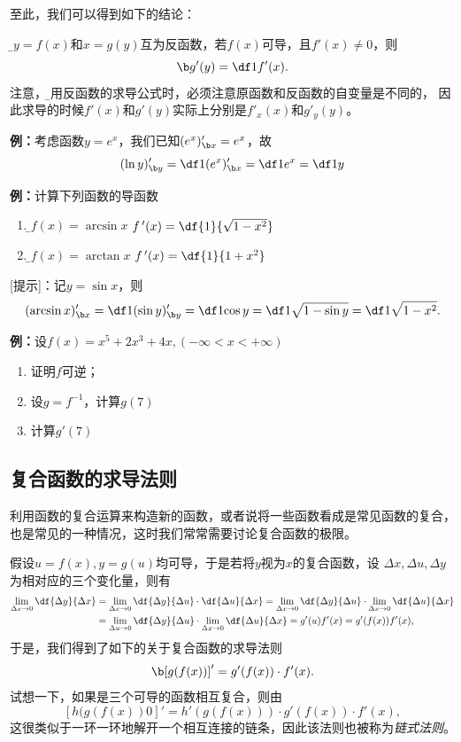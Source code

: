 至此，我们可以得到如下的结论：

{\b 设$y=f(x)$和$x=g(y)$互为反函数，若$f(x)$可导，且$f'(x)\ne 0$，则}
$$\b g'(y)=\df1{f'(x)}.$$
注意，{\b 使用反函数的求导公式时，必须注意原函数和反函数的自变量是不同的，
因此求导的时候$f'(x)$和$g'(y)$实际上分别是$f'_x(x)$和$g'_y(y)$。}

{\bf 例：}考虑函数$y=e^x$，我们已知$(e^x)'_{\b x}=e^x$，故
$$(\ln y)'_{\b y}=\df1{(e^x)'_{\b x}}=\df1{e^x}=\df1y$$

{\bf 例：}计算下列函数的导函数
\begin{enumerate}[(1)]
  \setlength{\itemindent}{1cm}
  \item {\b$f(x)=\arcsin x$ \hfill $f\,'(x)=\df{1}{\sqrt{1-x^2}}$} 
  \item {\b$f(x)=\arctan x$ \hfill $f\,'(x)=\df{1}{1+x^2}$}
\end{enumerate}

[提示]：记$y=\sin x$，则
$$(\arcsin x)'_{\b x}=\df1{(\sin y)'_{\b y}}=\df1{\cos y}
=\df1{\sqrt{1-\sin y}}=\df1{\sqrt{1-x^2}}.$$

{\bf 例：}设$f(x)=x^5+2x^3+4x,(-\infty<x<+\infty)$
\begin{enumerate}[(1)]
  \setlength{\itemindent}{1cm}
  \item 证明$f$可逆；
  \item 设$g=f^{-1}$，计算$g(7)$
  \item 计算$g'(7)$
\end{enumerate}

\subsection{复合函数的求导法则}

利用函数的复合运算来构造新的函数，或者说将一些函数看成是常见函数的复合，
也是常见的一种情况，这时我们常常需要讨论复合函数的极限。

假设$u=f(x),y=g(u)$均可导，于是若将$y$视为$x$的复合函数，设
$\Delta x,\Delta u,\Delta y$为相对应的三个变化量，则有
\begin{align*}
	\lim\limits_{\Delta x\to 0}\df{\Delta y}{\Delta x}
	&=\lim\limits_{\Delta x\to 0}\df{\Delta y}{\Delta u}
	\cdot\df{\Delta u}{\Delta x}
	=\lim\limits_{\Delta x\to 0}\df{\Delta y}{\Delta u}
	\cdot\lim\limits_{\Delta x\to 0}\df{\Delta u}{\Delta x}\\
	&=\lim\limits_{\Delta u\to 0}\df{\Delta y}{\Delta u}
	\cdot\lim\limits_{\Delta x\to 0}\df{\Delta u}{\Delta x}
	=g'(u)f'(x)=g'(f(x))f'(x),
\end{align*}
于是，我们得到了如下的关于复合函数的求导法则
$$\b [g(f(x))]'=g'(f(x))\cdot f'(x).$$
试想一下，如果是三个可导的函数相互复合，则由
$$[h(g(f(x))0]'=h'(g(f(x)))\cdot g'(f(x))\cdot f'(x),$$
这很类似于一环一环地解开一个相互连接的链条，因此该法则也被称为{\it 链式法则}。

